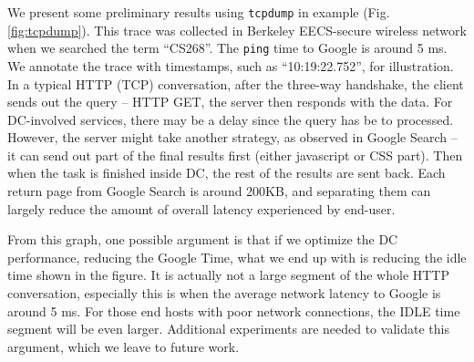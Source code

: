  We present some preliminary results using \texttt{tcpdump} in example (Fig.\,\ref{fig:tcpdump}). This trace was collected in Berkeley EECS-secure wireless network when we searched the term ``CS268''. The \texttt{ping} time to Google is around 5 ms. We annotate the trace with timestamps, such as ``10:19:22.752'', for illustration. In a typical HTTP (TCP) conversation, after the three-way handshake, the client sends out the query -- HTTP GET, the server then responds with the data. For DC-involved services, there may be a delay since the query has be to processed. However, the server might take another strategy, as observed in Google Search -- it can send out part of the final results first (either javascript or CSS part). Then when the task is finished inside DC, the rest of the results are sent back. Each return page from Google Search is around 200KB, and separating them can largely reduce the amount of overall latency experienced by end-user. 

From this graph, one possible argument is that if we optimize the DC performance, reducing the Google Time, what we end up with is reducing the idle time shown in the figure. It is actually not a large segment of the whole HTTP conversation, especially this is when the average network latency to Google is around 5 ms. For those end hosts with poor network connections, the IDLE time segment will be even larger. Additional experiments are needed to validate this argument, which we leave to future work.


